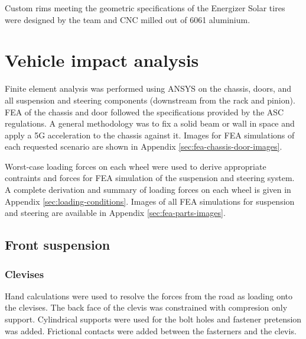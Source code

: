 \documentclass[10pt]{article}
\begin{document}
Custom rims meeting the geometric specifications of the Energizer Solar tires were designed by the team and CNC milled out of 6061 aluminium.











\section{Vehicle impact analysis}
Finite element analysis was performed using ANSYS on the chassis, doors, and all suspension and steering components (downstream from the rack and pinion). FEA of the chassis and door followed the specifications provided by the ASC regulations. A general methodology was to fix a solid beam or wall in space and apply a 5G acceleration to the chassis against it. Images for FEA simulations of each requested scenario are shown in Appendix \ref{sec:fea-chassis-door-images}.

Worst-case loading forces on each wheel were used to derive appropriate contraints and forces for FEA simulation of the suspension and steering system. A complete derivation and summary of loading forces on each wheel is given in Appendix \ref{sec:loading-conditions}. Images of all FEA simulations for suspension and steering are available in Appendix \ref{sec:fea-parts-images}.

\subsection{Front suspension}
\subsubsection{Clevises}
Hand calculations were used to resolve the forces from the road as loading onto the clevises. The back face of the clevis was constrained with compresion only support. Cylindrical supports were used for the bolt holes and fastener pretension was added. Frictional contacts were added between the fasterners and the clevis.
\end{document}
